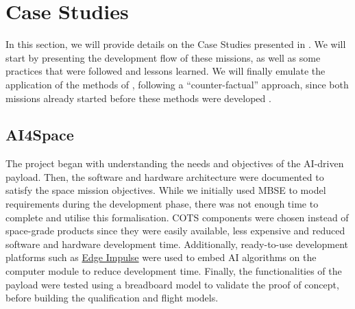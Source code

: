 \documentclass[]{iac}
\def\todo#1{}
\begin{document}

\section{Case Studies}

In this section, we will provide details on the Case Studies presented in . We will start by presenting the development flow of these missions, as well as some practices that were followed and lessons learned. We will finally emulate the application of the methods of , following a ``counter-factual'' approach, since both missions already started before these methods were developed \autocite{hein_evaluating_2020}.
\todo{Too informal?}




\subsection{AI4Space}
\label{sec:ai4spaceresults}




The project began with understanding the needs and objectives of the AI-driven payload. Then, the software and hardware architecture were documented to satisfy the space mission objectives. While we initially used MBSE to model requirements during the development phase, there was not enough time to complete and utilise this formalisation. COTS components were chosen instead of space-grade products since they were easily available, less expensive and reduced software and hardware development time. Additionally, ready-to-use development platforms such as \href{https://www.edgeimpulse.com/}{Edge Impulse} were used to embed AI algorithms on the computer module to reduce development time. Finally, the functionalities of the payload were tested using a breadboard model to validate the proof of concept, before building the qualification and flight models. %
\end{document}
